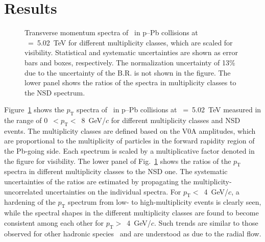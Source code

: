 
\section {Results}
\label{sec:results}

\begin{figure}[!hbt]
	\centering
	\caption{ Transverse momentum spectra of \fzero~in p--Pb collisions at \snn~=~5.02~TeV for different multiplicity classes, which are scaled for visibility. Statistical and systematic uncertainties are shown as error bars and boxes, respectively. The normalization uncertainty of 13\% due to the uncertainty of the $\mathrm{B.R.}$ is not shown in the figure. The lower panel shows the ratios of the spectra in multiplicity classes to the NSD spectrum. }
	\label{fig:pt}
\end{figure}

Figure~\ref{fig:pt} shows the $p_{\mathrm{T}}$ spectra of \fzero~in p--Pb collisions at \snn~=~5.02~TeV measured in the range of 0~$<p_{\mathrm{T}}<$~8~GeV/$c$ for different multiplicity classes and NSD events. The multiplicity classes are defined based on the V0A amplitudes, which are proportional to the multiplicity of particles in the forward rapidity region of the Pb-going side. Each spectrum is scaled by a multiplicative factor denoted in the figure for visibility. The lower panel of Fig.~\ref{fig:pt} shows the ratios of the $p_{\mathrm{T}}$ spectra in different multiplicity classes to the NSD one. The systematic uncertainties of the ratios are estimated by propagating the multiplicity-uncorrelated uncertainties on the individual spectra. For $p_{\mathrm{T}}<$~4~GeV/$c$, a hardening of the $p_{\mathrm{T}}$ spectrum from low- to high-multiplicity events is clearly seen, while the spectral shapes in the different multiplicity classes are found to become consistent among each other for $p_{\mathrm{T}}>$~4~GeV/$c$. Such trends are similar to those observed for other hadronic species~\cite{Schnedermann:1993ws, ALICE:2019hno} and are understood as due to the radial flow.


